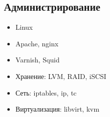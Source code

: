 \documentclass[10pt,a4paper,sans]{moderncv}        %
\begin{document}
\begin{itemize}


\end{itemize}

\subsection{Администрирование}

\begin{itemize}
\item Linux
\item Apache, nginx
\item Varnish, Squid
\item Хранение: LVM, RAID, iSCSI
\item Сеть: iptables, ip, tc
\item Виртуализация: libvirt, kvm
\end{itemize}
\end{document}
